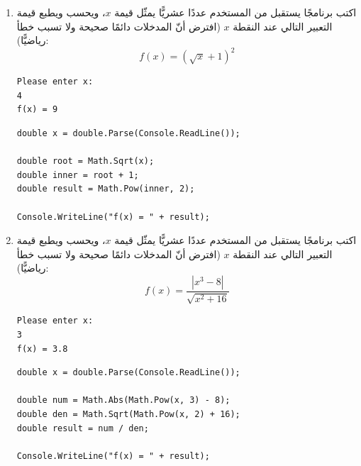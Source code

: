 \documentclass[14pt]{extarticle}
\begin{document}
\begin{enumerate}[itemsep=2em]
\item
اكتب برنامجًا يستقبل من المستخدم عددًا عشريًّا يمثّل قيمة $x$، ويحسب ويطبع قيمة التعبير التالي عند النقطة $x$ (افترض أنّ المدخلات دائمًا صحيحة ولا تسبب خطأ رياضيًّا):
\[ f(x) = (\sqrt{x} + 1)^2 \]
\ifdetailed
\begin{boxExample}
\begin{english}
\begin{verbatim}
Please enter x:
4
f(x) = 9
\end{verbatim}
\end{english}
\end{boxExample}
\fi
\ifwithsols
\begin{boxSolution}
\begin{english}
\begin{verbatim}
double x = double.Parse(Console.ReadLine());

double root = Math.Sqrt(x);
double inner = root + 1;
double result = Math.Pow(inner, 2);

Console.WriteLine("f(x) = " + result);
\end{verbatim}
\end{english}
\end{boxSolution}
\fi
\filbreak

\item
اكتب برنامجًا يستقبل من المستخدم عددًا عشريًّا يمثّل قيمة $x$، ويحسب ويطبع قيمة التعبير التالي عند النقطة $x$ (افترض أنّ المدخلات دائمًا صحيحة ولا تسبب خطأ رياضيًّا):
\[ f(x) = \frac{|x^3 - 8|}{\sqrt{x^2 + 16}} \]
\ifdetailed
\begin{boxExample}
\begin{english}
\begin{verbatim}
Please enter x:
3
f(x) = 3.8
\end{verbatim}
\end{english}
\end{boxExample}
\fi
\ifwithsols
\begin{boxSolution}
\begin{english}
\begin{verbatim}
double x = double.Parse(Console.ReadLine());

double num = Math.Abs(Math.Pow(x, 3) - 8);
double den = Math.Sqrt(Math.Pow(x, 2) + 16);
double result = num / den;

Console.WriteLine("f(x) = " + result);
\end{verbatim}
\end{english}
\end{boxSolution}
\fi
\filbreak


\end{enumerate}
\end{document}
